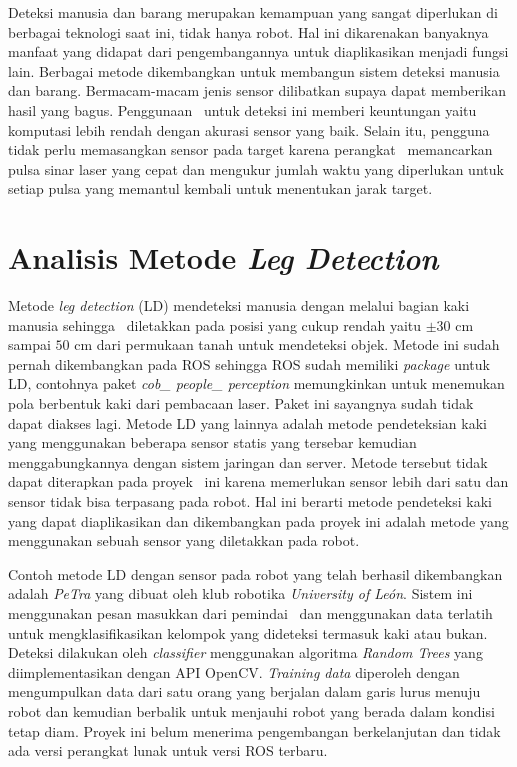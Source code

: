 Deteksi manusia dan barang merupakan kemampuan yang sangat diperlukan di berbagai teknologi saat ini, tidak hanya robot. Hal ini dikarenakan banyaknya manfaat yang didapat dari pengembangannya untuk diaplikasikan menjadi fungsi lain. Berbagai metode dikembangkan untuk membangun sistem deteksi manusia dan barang. Bermacam-macam jenis sensor dilibatkan supaya dapat memberikan hasil yang bagus. Penggunaan \lidar\ untuk deteksi ini memberi keuntungan yaitu komputasi lebih rendah dengan akurasi sensor yang baik. Selain itu, pengguna tidak perlu memasangkan sensor pada target karena perangkat \lidar\ memancarkan pulsa sinar laser yang cepat dan mengukur jumlah waktu yang diperlukan untuk setiap pulsa yang memantul kembali untuk menentukan jarak target.

\section{Analisis Metode \textit{Leg Detection}}
\label{sec:Metode_02}

    Metode \textit{leg detection} (LD) mendeteksi manusia dengan melalui bagian kaki manusia sehingga \lidar\ diletakkan pada posisi yang cukup rendah yaitu $\pm 30$ cm sampai $50$ cm dari permukaan tanah untuk mendeteksi objek\cite{c1}. Metode ini sudah pernah dikembangkan pada ROS sehingga ROS sudah memiliki \textit{package} untuk LD, contohnya paket \textit{cob\_ people\_ perception} memungkinkan untuk menemukan pola berbentuk kaki dari pembacaan laser. Paket ini sayangnya sudah tidak dapat diakses lagi. Metode LD yang lainnya adalah metode pendeteksian kaki yang menggunakan beberapa sensor statis yang tersebar kemudian menggabungkannya dengan sistem jaringan dan server. Metode tersebut tidak dapat diterapkan pada proyek \capstone\ ini karena memerlukan sensor lebih dari satu dan sensor tidak bisa terpasang pada robot. Hal ini berarti metode pendeteksi kaki yang dapat diaplikasikan dan dikembangkan pada proyek ini adalah metode yang menggunakan sebuah sensor yang diletakkan pada robot. 

    Contoh metode LD dengan sensor pada robot yang telah berhasil dikembangkan adalah \textit{PeTra} yang dibuat oleh klub robotika \textit{University of León}. Sistem ini menggunakan pesan masukkan dari pemindai \lidar\ dan menggunakan data terlatih untuk mengklasifikasikan kelompok yang dideteksi termasuk kaki atau bukan. Deteksi dilakukan oleh \textit{classifier} menggunakan algoritma \textit{Random Trees} yang diimplementasikan dengan API OpenCV. \textit{Training data} diperoleh dengan mengumpulkan data dari satu orang yang berjalan dalam garis lurus menuju robot dan kemudian berbalik untuk menjauhi robot yang berada dalam kondisi tetap diam. Proyek ini belum menerima pengembangan berkelanjutan dan tidak ada versi perangkat lunak untuk versi ROS terbaru. 

